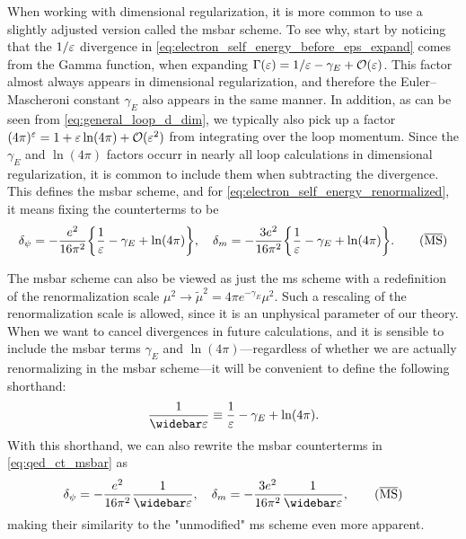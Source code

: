 When working with dimensional regularization, it is more common to use a slightly adjusted version called the \acrfull{msbar} scheme.
To see why, start by noticing that the $1/\varepsilon$ divergence in \cref{eq:electron_self_energy_before_eps_expand} comes from the Gamma function, when expanding $\Gamma(\varepsilon)=1/\varepsilon - \gamma_E + \mathcal{O}(\varepsilon)$. This factor almost always appears in dimensional regularization, and therefore the Euler--Mascheroni constant $\gamma_E$ also appears in the same manner.
In addition, as can be seen from \cref{eq:general_loop_d_dim}, we typically also pick up a factor $(4\pi)^\varepsilon = 1+\varepsilon\ln(4\pi) + \mathcal{O}(\varepsilon^2)$ from integrating over the loop momentum.
Since the $\gamma_E$ and $\ln(4\pi)$ factors occurr in nearly all loop calculations in dimensional regularization, it is common to include them when subtracting the divergence. This defines the \gls{msbar} scheme, and for \cref{eq:electron_self_energy_renormalized}, it means fixing the counterterms to be
\begin{equation}\label{eq:qed_ct_msbar}
    \delta_\psi = -\frac{e^2}{16\pi^2} \biggl\{\frac{1}{\varepsilon} - \gamma_E + \ln(4\pi) \biggr\},
    \quad
    \delta_m = -\frac{3e^2}{16\pi^2} \biggl\{ \frac{1}{\varepsilon} - \gamma_E + \ln(4\pi) \biggr\}. \qquad (\overline{\text{MS}})
\end{equation}

The \gls{msbar} scheme can also be viewed as just the \gls{ms} scheme with a redefinition of the renormalization scale $\mu^2\to\tilde\mu^2=4\pi e^{-\gamma_E}\mu^2$.
Such a rescaling of the renormalization scale is allowed, since it is an unphysical parameter of our theory.
When we want to cancel divergences in future calculations, and it is sensible to include the \gls{msbar} terms $\gamma_E$ and $\ln(4\pi)$---regardless of whether we are actually renormalizing in the \gls{msbar} scheme---it will be convenient to define the following shorthand:
\begin{equation}
    \frac{1}{\widebar\eps} \equiv \frac{1}{\eps} - \gamma_E + \ln(4\pi).
\end{equation}
With this shorthand, we can also rewrite the \gls{msbar} counterterms in \cref{eq:qed_ct_msbar} as
\begin{equation}
    \delta_\psi = -\frac{e^2}{16\pi^2} \frac{1}{\widebar\eps},
    \quad
    \delta_m = -\frac{3e^2}{16\pi^2} \frac{1}{\widebar\eps}, \qquad (\MSbar)
\end{equation}
making their similarity to the "unmodified" \gls{ms} scheme even more apparent.

